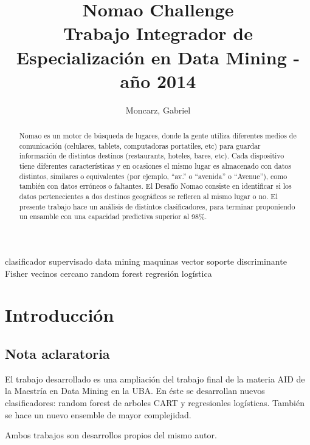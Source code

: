 \documentclass[journal]{IEEEtran}
\begin{document}
\title{  Nomao Challenge \\
	{\large Trabajo Integrador de Especialización en Data Mining - año 2014} \\
} 
\author{Moncarz, Gabriel} 
\maketitle %


\begin{abstract}
Nomao es un motor de búsqueda de lugares, donde la gente utiliza diferentes medios
de comunicación (celulares, tablets, computadoras portatiles, etc) 
para guardar información de distintos destinos (restaurants, hoteles,
bares, etc). Cada dispositivo tiene diferentes características y 
en ocasiones el mismo lugar
es almacenado con datos distintos, similares o equivalentes (por ejemplo, ``av.'' o
``avenida'' o ``Avenue''), como también con datos erróneos o faltantes. 
El Desafío Nomao consiste en identificar si los datos pertenecientes
a dos destinos geográficos se refieren al mismo lugar o no. El presente
trabajo hace un análisis de distintos clasificadores, para terminar
proponiendo un ensamble con una capacidad predictiva superior al 98\%.
\end{abstract}

\begin{IEEEkeywords}
clasificador supervisado data mining maquinas vector soporte
discriminante Fisher vecinos cercano random forest
regresión logística
\end{IEEEkeywords}

\tableofcontents

\section{Introducción}

\subsection{Nota aclaratoria}
El trabajo desarrollado es una ampliación del trabajo final de la materia
AID de la Maestría en Data Mining en la UBA. En éste se desarrollan nuevos
clasificadores: random forest de arboles CART y regresionles logísticas.
También se hace un nuevo ensemble de mayor complejidad.

Ambos trabajos son desarrollos propios del mismo autor.
\end{document}
